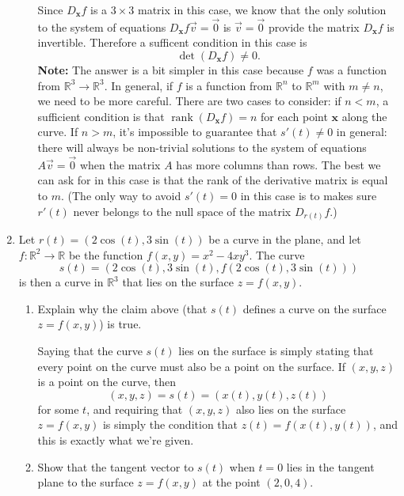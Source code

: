 \documentclass[letterpaper,12pt]{article}
\newcommand{\R}{\mathbb{R}}
\begin{document}
\begin{enumerate}
\begin{enumerate}
\bigskip

Since $D_{\mathbf{x}}f$ is a $3\times 3$ matrix in this case, we know that the only solution to the system of equations $D_{\mathbf{x}}f\vec{v}=\vec{0}$ is $\vec{v}=\vec{0}$ provide the matrix $D_{\mathbf{x}}f$ is invertible. Therefore a sufficent condition in this case is
\[
 \det(D_{\mathbf{x}}f) \neq 0.
\]
{\bf Note:} The answer is a bit simpler in this case because $f$ was a function from $\R^3\to \R^3$. In general, if $f$ is a function from $\R^n$ to $\R^m$ with $m\neq n$, we need to be more careful. There are two cases to consider: if $n<m$, a sufficient condition is that $\operatorname{rank}(D_{\mathbf{x}}f)=n$ for each point $\mathbf{x}$ along the curve. If $n>m$, it's impossible to guarantee that $s'(t)\neq 0$ in general: there will always be non-trivial solutions to the system of equations $A\vec{v}=\vec{0}$ when the matrix $A$ has more columns than rows. The best we can ask for in this case is that the rank of the derivative matrix is equal to $m$. (The only way to avoid $s'(t)=0$ in this case is to makes sure $r'(t)$ never belongs to the null space of the matrix $D_{r(t)}f$.)
\end{enumerate}

\item Let $r(t)=(2\cos(t), 3\sin(t))$ be a curve in the plane, and let $f:\R^2\to \R$ be the function $f(x,y) = x^2-4xy^3$. The curve
\[
 s(t) = (2\cos(t),3\sin(t), f(2\cos(t),3\sin(t)))
\]
is then a curve in $\R^3$ that lies on the surface $z=f(x,y)$.
\begin{enumerate}
 \item Explain why the claim above (that $s(t)$ defines a curve on the surface $z=f(x,y)$) is true.

\bigskip

Saying that the curve $s(t)$ lies on the surface is simply stating that every point on the curve must also be a point on the surface. If $(x,y,z)$ is a point on the curve, then
\[
 (x,y,z)=s(t)=(x(t),y(t),z(t))
\]
for some $t$, and requiring that $(x,y,z)$ also lies on the surface $z=f(x,y)$ is simply the condition that $z(t)=f(x(t),y(t))$, and this is exactly what we're given.

 \item Show that the tangent vector to $s(t)$ when $t=0$ lies in the tangent plane to the surface $z=f(x,y)$ at the point $(2,0,4)$.

\bigskip


\end{enumerate}
\end{enumerate}
\end{document}
